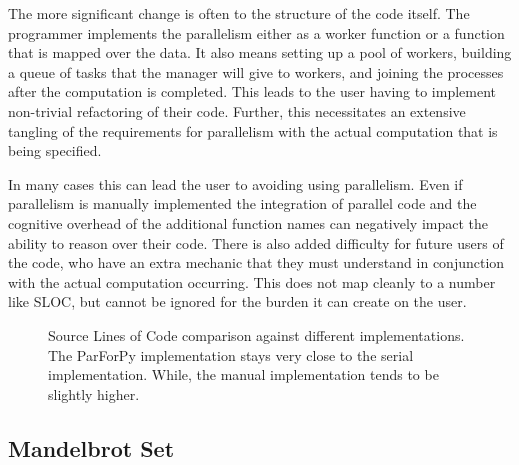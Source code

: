 \documentclass[conference]{IEEEtran}
\begin{document}
The more significant change is often to the structure of the code itself.
The programmer implements the parallelism either as a worker function or a function that
is mapped over the data.
It also means setting up a pool of workers, building a queue of tasks that the manager will give to workers, and joining the processes after the computation is completed.
This leads to the user having to implement non-trivial refactoring of their code. 
Further, this necessitates an extensive tangling of the requirements for parallelism with
the actual computation that is being specified. 

In many cases this can lead the user to avoiding using parallelism.
Even if parallelism is manually implemented the integration of parallel code and 
the cognitive overhead of the additional function names can negatively impact 
the ability to reason over their code.
There is also added difficulty for future users of the code, who have an extra mechanic 
that they must understand in conjunction with the actual computation occurring.
This does not map cleanly to a number like SLOC, but cannot be ignored for the burden
it can create on the user.


\begin{figure}[t]
\caption{Source Lines of Code comparison against different implementations.
The ParForPy implementation stays very close to the serial implementation. While,
the manual implementation tends to be slightly higher.}
\label{slocchart}
\end{figure}

\subsection{Mandelbrot Set}
\end{document}
